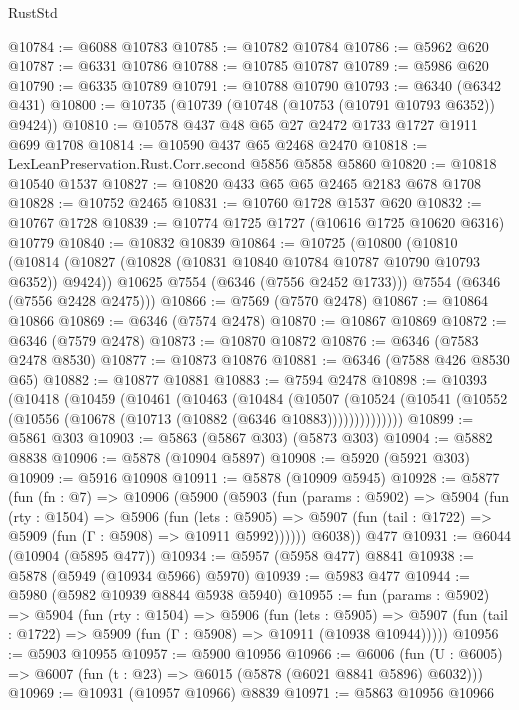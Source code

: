 \begin{lexlean}{RustStd}
\begin{coremodule}
@10784 := @6088 @10783
@10785 := @10782 @10784
@10786 := @5962 @620
@10787 := @6331 @10786
@10788 := @10785 @10787
@10789 := @5986 @620
@10790 := @6335 @10789
@10791 := @10788 @10790
@10793 := @6340 (@6342 @431)
@10800 := @10735 (@10739 (@10748 (@10753 (@10791 @10793 @6352)) @9424))
@10810 := @10578 @437 @48 @65 @27 @2472 @1733 @1727 @1911 @699 @1708
@10814 := @10590 @437 @65 @2468 @2470
@10818 := LexLeanPreservation.Rust.Corr.second @5856 @5858 @5860
@10820 := @10818 @10540 @1537
@10827 := @10820 @433 @65 @65 @2465 @2183 @678 @1708
@10828 := @10752 @2465
@10831 := @10760 @1728 @1537 @620
@10832 := @10767 @1728
@10839 := @10774 @1725 @1727 (@10616 @1725 @10620 @6316) @10779
@10840 := @10832 @10839
@10864 := @10725
    (@10800
      (@10810
        (@10814 (@10827 (@10828 (@10831 @10840 @10784 @10787 @10790 @10793 @6352)) @9424))
        @10625
        @7554
        (@6346 (@7556 @2452 @1733)))
      @7554
      (@6346 (@7556 @2428 @2475)))
@10866 := @7569 (@7570 @2478)
@10867 := @10864 @10866
@10869 := @6346 (@7574 @2478)
@10870 := @10867 @10869
@10872 := @6346 (@7579 @2478)
@10873 := @10870 @10872
@10876 := @6346 (@7583 @2478 @8530)
@10877 := @10873 @10876
@10881 := @6346 (@7588 @426 @8530 @65)
@10882 := @10877 @10881
@10883 := @7594 @2478
@10898 := @10393
    (@10418
      (@10459
        (@10461
          (@10463
            (@10484
              (@10507
                (@10524 (@10541 (@10552 (@10556 (@10678 (@10713 (@10882 (@6346 @10883))))))))))))))
@10899 := @5861 @303
@10903 := @5863 (@5867 @303) (@5873 @303)
@10904 := @5882 @8838
@10906 := @5878 (@10904 @5897)
@10908 := @5920 (@5921 @303)
@10909 := @5916 @10908
@10911 := @5878 (@10909 @5945)
@10928 := @5877
    (fun (fn : @7) =>
    @10906
      (@5900
        (@5903
          (fun (params : @5902) =>
          @5904
            (fun (rty : @1504) =>
            @5906
              (fun (lets : @5905) =>
              @5907 (fun (tail : @1722) => @5909 (fun (Γ : @5908) => @10911 @5992))))))
        @6038))
    @477
@10931 := @6044 (@10904 (@5895 @477))
@10934 := @5957 (@5958 @477) @8841
@10938 := @5878 (@5949 (@10934 @5966) @5970)
@10939 := @5983 @477
@10944 := @5980 (@5982 @10939 @8844 @5938 @5940)
@10955 := fun (params : @5902) =>
  @5904
    (fun (rty : @1504) =>
    @5906
      (fun (lets : @5905) =>
      @5907 (fun (tail : @1722) => @5909 (fun (Γ : @5908) => @10911 (@10938 @10944)))))
@10956 := @5903 @10955
@10957 := @5900 @10956
@10966 := @6006
    (fun (U : @6005) => @6007 (fun (t : @23) => @6015 (@5878 (@6021 @8841 @5896) @6032)))
@10969 := @10931 (@10957 @10966) @8839
@10971 := @5863 @10956 @10966

\end{coremodule}
\end{lexlean}
